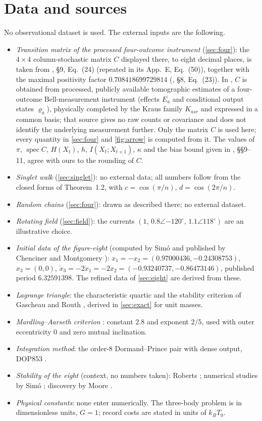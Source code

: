 \documentclass[11pt]{article}
\theoremstyle{definition}\newtheorem{definition}[theorem]{Definition}
\theoremstyle{remark}\newtheorem{remark}[theorem]{Remark}
\begin{document}
\section{Data and sources}\label{sec:data}
No observational dataset is used. The external inputs are the following.
\begin{itemize}
\item \emph{Transition matrix of the processed four-outcome instrument} (\cref{sec:four}): the $4\times4$ column-stochastic matrix $C$ displayed there, to eight decimal places, is taken from \cite{Singh}, \S9, Eq.~(24) (repeated in its App.~E, Eq.~(50)), together with the maximal positivity factor $0.708418699729814$ (\cite{Singh}, \S8, Eq.~(23)). In \cite{Singh}, $C$ is obtained from processed, publicly available tomographic estimates of a four-outcome Bell-measurement instrument (effects $E_a$ and conditional output states $\varrho_a$), physically completed by the Kraus family $K_{asr}$ and expressed in a common basis; that source gives no raw counts or covariance and does not identify the underlying measurement further. Only the matrix $C$ is used here; every quantity in \cref{sec:four} and \cref{fig:arrow} is computed from it. The values of $\pi$, $\operatorname{spec}C$, $H(X_t)$, $h$, $I(X_t;X_{t+1})$, $\kappa$ and the bias bound given in \cite{Singh}, \S\S9--11, agree with ours to the rounding of $C$.
\item \emph{Singlet walk} (\cref{sec:singlet}): no external data; all numbers follow from the closed forms of Theorem~1.2, with $c=\cos(\pi/n)$, $d=\cos(2\pi/n)$.
\item \emph{Random chains} (\cref{sec:four}): drawn as described there; no external dataset.
\item \emph{Rotating field} (\cref{sec:field}): the currents $(1,\,0.8\angle{-120^\circ},\,1.1\angle{118^\circ})$ are an illustrative choice.
\item \emph{Initial data of the figure-eight} (computed by Sim\'o and published by Chenciner and Montgomery \cite{CM}): $x_1=-x_2=(0.97000436,-0.24308753)$, $x_3=(0,0)$, $\dot x_3=-2\dot x_1=-2\dot x_2=(-0.93240737,-0.86473146)$, published period $6.32591398$. The refined data of \cref{sec:eight} are derived from these.
\item \emph{Lagrange triangle}: the characteristic quartic and the stability criterion of Gascheau and Routh \cite{Gascheau,Routh}, derived in \cref{sec:exact} for unit masses.
\item \emph{Mardling--Aarseth criterion} \cite{MA}: constant $2.8$ and exponent $2/5$, used with outer eccentricity $0$ and zero mutual inclination.
\item \emph{Integration method}: the order-8 Dormand--Prince pair with dense output, DOP853 \cite{HNW}.
\item \emph{Stability of the eight} (context, no numbers taken): Roberts \cite{Roberts}; numerical studies by Sim\'o \cite{Simo}; discovery by Moore \cite{Moore}.
\item \emph{Physical constants}: none enter numerically. The three-body problem is in dimensionless units, $G=1$; record costs are stated in units of $k_BT_0$.
\end{itemize}
\end{document}

